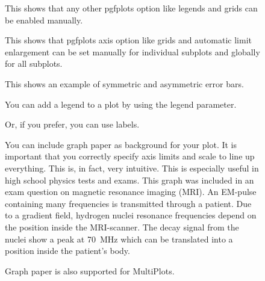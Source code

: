 \documentclass[a4paper,11pt]{article}
\begin{document}
\begin{figure}
\centering

\caption{This shows that any other pgfplots option like legends and
         grids can be enabled manually.}
\end{figure}

\begin{figure}
\centering

\caption{This shows that pgfplots axis option like grids and automatic
         limit enlargement can be set manually for individual subplots
         and globally for all subplots.}
\end{figure}

\begin{figure}
\centering

\caption{This shows an example of symmetric and asymmetric error bars.}
\end{figure}

\begin{figure}
\centering

\caption{You can add a legend to a plot by using the legend parameter.}
\end{figure}

\begin{figure}
\centering

\caption{Or, if you prefer, you can use labels.}
\end{figure}

\begin{figure}
\centering

\caption{You can include graph paper as background for your plot. It is important that you correctly specify axis limits and scale to line up everything. This is, in fact, very intuitive. This is especially useful in high school physics tests and exams. This graph was included in an exam question on magnetic resonance imaging (MRI). An EM-pulse containing many frequencies is transmitted through a patient. Due to a gradient field, hydrogen nuclei resonance frequencies depend on the position inside the MRI-scanner. The decay signal from the nuclei show a peak at \SI{70}{\mega\hertz} which can be translated into a position inside the patient's body.}
\end{figure}

\begin{figure}
\centering

\caption{Graph paper is also supported for MultiPlots.}
\end{figure}
\end{document}
